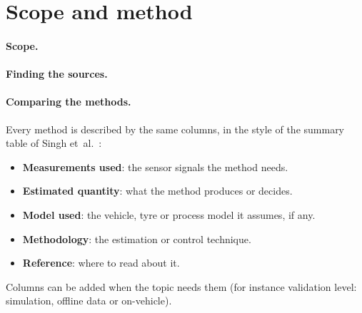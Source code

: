 \section{Scope and method}
\label{sec:method}

\paragraph{Scope.}

\paragraph{Finding the sources.}

\paragraph{Comparing the methods.}
Every method is described by the same columns, in the style of the summary table of
Singh et~al.~\cite{singh2019}:

\begin{itemize}
  \item \textbf{Measurements used}: the sensor signals the method needs.
  \item \textbf{Estimated quantity}: what the method produces or decides.
  \item \textbf{Model used}: the vehicle, tyre or process model it assumes, if any.
  \item \textbf{Methodology}: the estimation or control technique.
  \item \textbf{Reference}: where to read about it.
\end{itemize}

\noindent Columns can be added when the topic needs them (for instance validation level:
simulation, offline data or on-vehicle).
